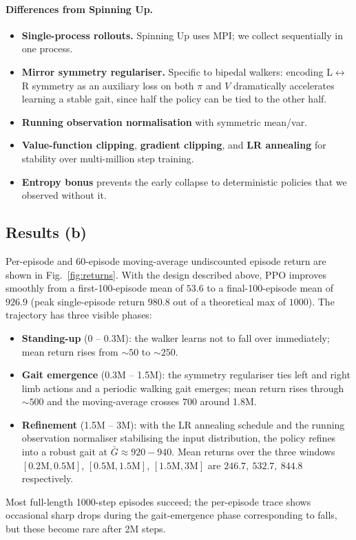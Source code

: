\documentclass[11pt]{article}
\begin{document}
\paragraph{Differences from Spinning Up.}
\begin{itemize}[leftmargin=*,itemsep=0pt]
\item \textbf{Single-process rollouts.} Spinning Up uses MPI; we
      collect sequentially in one process.
\item \textbf{Mirror symmetry regulariser.} Specific to bipedal
      walkers: encoding L$\leftrightarrow$R symmetry as an auxiliary
      loss on both $\pi$ and $V$ dramatically accelerates learning a
      stable gait, since half the policy can be tied to the other half.
\item \textbf{Running observation normalisation} with symmetric mean/var.
\item \textbf{Value-function clipping}, \textbf{gradient clipping},
      and \textbf{LR annealing} for stability over multi-million step
      training.
\item \textbf{Entropy bonus} prevents the early collapse to deterministic
      policies that we observed without it.
\end{itemize}

\subsection{Results (b)}

Per-episode and 60-episode moving-average undiscounted episode return
are shown in Fig.~\ref{fig:returns}. With the design described above,
PPO improves smoothly from a first-100-episode mean of $53.6$ to a
final-100-episode mean of $\mathbf{926.9}$ (peak single-episode return
$980.8$ out of a theoretical max of $1000$). The trajectory has three
visible phases:
\begin{itemize}[leftmargin=*,itemsep=0pt]
\item \textbf{Standing-up} (0 -- 0.3M): the walker learns not to fall
      over immediately; mean return rises from $\sim50$ to $\sim250$.
\item \textbf{Gait emergence} (0.3M -- 1.5M): the symmetry regulariser
      ties left and right limb actions and a periodic walking gait
      emerges; mean return rises through $\sim500$ and the
      moving-average crosses $700$ around 1.8M.
\item \textbf{Refinement} (1.5M -- 3M): with the LR annealing schedule
      and the running observation normaliser stabilising the input
      distribution, the policy refines into a robust gait at
      $\bar G \approx 920\!-\!940$. Mean returns over the three windows
      $[0.2\text{M}, 0.5\text{M}]$, $[0.5\text{M}, 1.5\text{M}]$,
      $[1.5\text{M}, 3\text{M}]$ are $246.7,\ 532.7,\ 844.8$
      respectively.
\end{itemize}
Most full-length 1000-step episodes succeed; the per-episode trace
shows occasional sharp drops during the gait-emergence phase
corresponding to falls, but these become rare after 2M steps.
\end{document}

